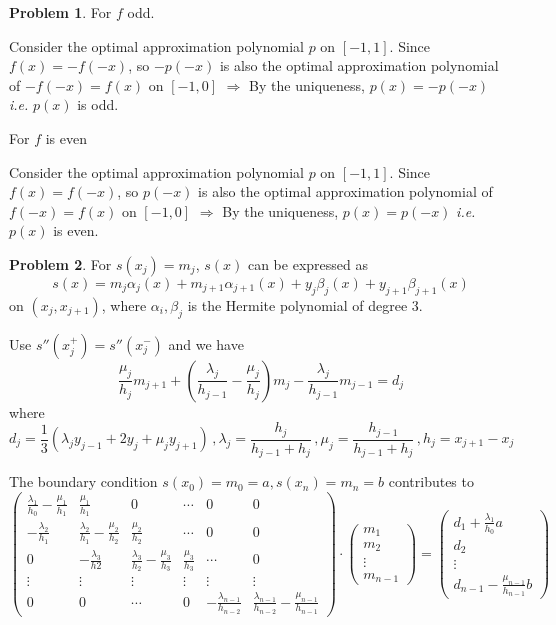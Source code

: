 \documentclass[a4paper]{article}
\theoremstyle{definition}
\newtheorem{problem}{Problem}
\theoremstyle{plain}
\newcommand{\<}{\left<}
\renewcommand{\>}{\right>}
\numberwithin{equation}{problem}
\newcommand{\ie}{ \textit{ i.e. } }
\begin{document}
\begin{problem}
    For  $ f $ odd.

    Consider the optimal approximation polynomial  $ p $ on  $ [-1,1] $. Since  $ f(x)=-f(-x) $, so  $ -p(-x) $ is also  the optimal approximation polynomial of  $ -f(-x)=f(x) $ on  $ [-1,0] $ $ \Rightarrow $  By the uniqueness,  $ p(x)=-p(-x) $ \ie  $ p(x) $ is odd.
    
    For  $ f $ is even 
    
    Consider the optimal approximation polynomial  $ p $ on  $ [-1,1] $. Since  $ f(x)=f(-x) $, so  $ p(-x) $ is also  the optimal approximation polynomial of  $ f(-x)=f(x) $ on  $ [-1,0] $ $ \Rightarrow $  By the uniqueness,  $ p(x)=p(-x) $ \ie  $ p(x) $ is even.
\end{problem}
\begin{problem}
    For  $ s(x_j)=m_j $, 
     $ s(x) $ can be expressed as 
     \[s(x)=m_j\alpha_j(x)+m_{j+1}\alpha_{j+1}(x)+y_j\beta_j(x)+y_{j+1}\beta_{j+1}(x)\]
     on  $ (x_j,x_{j+1}) $, where  $ \alpha_i,\beta_j $ is the Hermite polynomial of degree 3.
     
     Use  $ s''(x_j^+)=s''(x_j^-) $ and we have 
     \[\frac{\mu_j}{h_j}m_{j+1}+(\frac{\lambda_j}{h_{j-1}}-\frac{\mu_j}{h_j})m_j-\frac{\lambda_j}{h_{j-1}}m_{j-1}=d_j\]
     where 
     \[d_j=\frac{1}{3}\left(\lambda_jy_{j-1}+2y_j+\mu_jy_{j+1}\right)\,,\lambda_j=\frac{h_j}{h_{j-1}+h_j}\,,\mu_j=\frac{h_{j-1}}{h_{j-1}+h_j}\,,h_j=x_{j+1}-x_j\]

     The boundary condition  $ s(x_0)=m_0=a,s(x_n)=m_{n}=b $ contributes to 
     \[\begin{pmatrix}
        \frac{\lambda_1}{h_0}-\frac{\mu_1}{h_1}&\frac{\mu_1}{h_1}&0&\cdots&0&0\\
        -\frac{\lambda_2}{h_1}&\frac{\lambda_2}{h_1}-\frac{\mu_2}{h_2}&\frac{\mu_2}{h_2}&\cdots&0&0\\
        0&-\frac{\lambda_3}{h2}&\frac{\lambda_3}{h_2}-\frac{\mu_3}{h_3}&\frac{\mu_3}{h_3}&\cdots&0\\
        \vdots&\vdots&\vdots&\vdots&\vdots&\vdots\\
        0&0&\cdots&0&-\frac{\lambda_{n-1}}{h_{n-2}}&\frac{\lambda_{n-1}}{h_{n-2}}-\frac{\mu_{n-1}}{h_{n-1}}
     \end{pmatrix}\cdot\begin{pmatrix}
        m_1\\
        m_2\\
        \vdots\\
        m_{n-1}
     \end{pmatrix}=\begin{pmatrix}
        d_1+\frac{\lambda_1}{h_0}a\\
        d_2\\
        \vdots\\
        d_{n-1}-\frac{\mu_{n-1}}{h_{n-1}}b
     \end{pmatrix}\]


\end{problem}
\end{document}
